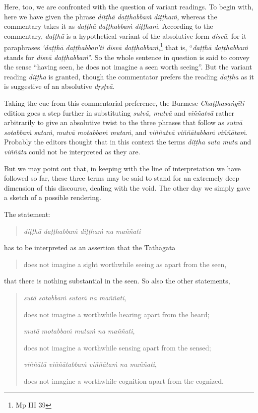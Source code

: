 Here, too, we are confronted with the question of variant readings. To begin with, here we have given the phrase \emph{diṭṭhā daṭṭhabbaṁ diṭṭhaṁ}, whereas the commentary takes it as \emph{daṭṭhā daṭṭhabbaṁ diṭṭhaṁ}. According to the commentary, \emph{daṭṭhā} is a hypothetical variant of the absolutive form \emph{disvā}, for it paraphrases \emph{`daṭṭhā daṭṭhabban'ti disvā daṭṭhabbaṁ},\footnote{Mp III 39} that is, ``\emph{daṭṭhā daṭṭhabbaṁ} stands for \emph{disvā daṭṭhabbaṁ}''. So the whole sentence in question is said to convey the sense ``having seen, he does not imagine a seen worth seeing''. But the variant reading \emph{diṭṭha} is granted, though the commentator prefers the reading \emph{daṭṭha} as it is suggestive of an absolutive \emph{dṛṣṭvā}.

Taking the cue from this commentarial preference, the Burmese \emph{Chaṭṭhasaṅgīti} edition goes a step further in substituting \emph{sutvā, mutvā} and \emph{viññatvā} rather arbitrarily to give an absolutive twist to the three phrases that follow as \emph{sutvā sotabbaṁ sutaṁ}, \emph{mutvā motabbaṁ mutaṁ}, and \emph{viññatvā viññātabbaṁ viññātaṁ}. Probably the editors thought that in this context the terms \emph{diṭṭha suta muta} and \emph{viññāta} could not be interpreted as they are.

But we may point out that, in keeping with the line of interpretation we have followed so far, these three terms may be said to stand for an extremely deep dimension of this discourse, dealing with the void. The other day we simply gave a sketch of a possible rendering.

The statement:

\begin{quote}
\emph{diṭṭhā daṭṭhabbaṁ diṭṭhaṁ na maññati}
\end{quote}

has to be interpreted as an assertion that the Tathāgata

\begin{quote}
does not imagine a sight worthwhile seeing as apart from the seen,
\end{quote}

that there is nothing substantial in the seen. So also the other statements,

\begin{quote}
\emph{sutā sotabbaṁ sutaṁ na maññati},

does not imagine a worthwhile hearing apart from the heard;

\emph{mutā motabbaṁ mutaṁ na maññati},

does not imagine a worthwhile sensing apart from the sensed;

\emph{viññātā viññātabbaṁ viññātaṁ na maññati},

does not imagine a worthwhile cognition apart from the cognized.
\end{quote}

